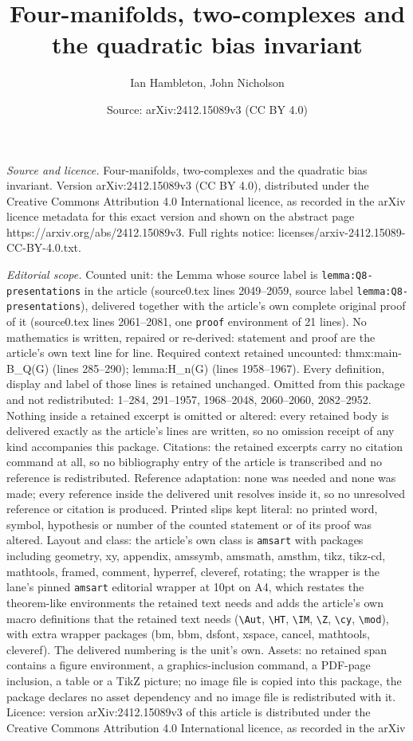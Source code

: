 \documentclass[10pt,a4paper]{amsart}
\title[Four-manifolds, two-complexes and the quadratic bias invaria]{Four-manifolds, two-complexes and the quadratic bias invariant}
\author{Ian Hambleton, John Nicholson}
\date{Source: arXiv:2412.15089v3 (CC BY 4.0)}
\begin{document}
\maketitle

\noindent\emph{Source and licence.} Four-manifolds, two-complexes and the quadratic bias invariant. Version arXiv:2412.15089v3 (CC BY 4.0), distributed under the Creative Commons Attribution 4.0 International licence, as recorded in the arXiv licence metadata for this exact version and shown on the abstract page https://arxiv.org/abs/2412.15089v3. Full rights notice: licenses/arxiv-2412.15089-CC-BY-4.0.txt.\par\smallskip

\noindent\textit{Editorial scope.} Counted unit: the Lemma whose source label is \texttt{lemma:Q8-presentations} in the article (source0.tex lines 2049--2059, source label \texttt{lemma:Q8-presentations}), delivered together with the article's own complete original proof of it (source0.tex lines 2061--2081, one \texttt{proof} environment of 21 lines). No mathematics is written, repaired or re-derived: statement and proof are the article's own text line for line. Required context retained uncounted: thmx:main-B\_Q(G) (lines 285--290); lemma:H\_n(G) (lines 1958--1967). Every definition, display and label of those lines is retained unchanged. Omitted from this package and not redistributed: 1--284, 291--1957, 1968--2048, 2060--2060, 2082--2952. Nothing inside a retained excerpt is omitted or altered: every retained body is delivered exactly as the article's lines are written, so no omission receipt of any kind accompanies this package. Citations: the retained excerpts carry no citation command at all, so no bibliography entry of the article is transcribed and no reference is redistributed. Reference adaptation: none was needed and none was made; every reference inside the delivered unit resolves inside it, so no unresolved reference or citation is produced. Printed slips kept literal: no printed word, symbol, hypothesis or number of the counted statement or of its proof was altered. Layout and class: the article's own class is \texttt{amsart} with packages including geometry, xy, appendix, amssymb, amsmath, amsthm, tikz, tikz-cd, mathtools, framed, comment, hyperref, cleveref, rotating; the wrapper is the lane's pinned \texttt{amsart} editorial wrapper at 10pt on A4, which restates the theorem-like environments the retained text needs and adds the article's own macro definitions that the retained text needs (\texttt{\textbackslash Aut}, \texttt{\textbackslash HT}, \texttt{\textbackslash IM}, \texttt{\textbackslash Z}, \texttt{\textbackslash cy}, \texttt{\textbackslash mod}), with extra wrapper packages (bm, bbm, dsfont, xspace, cancel, mathtools, cleveref). The delivered numbering is the unit's own. Assets: no retained span contains a figure environment, a graphics-inclusion command, a PDF-page inclusion, a table or a TikZ picture; no image file is copied into this package, the package declares no asset dependency and no image file is redistributed with it. Licence: version arXiv:2412.15089v3 of this article is distributed under the Creative Commons Attribution 4.0 International licence, as recorded in the arXiv 
\end{document}
